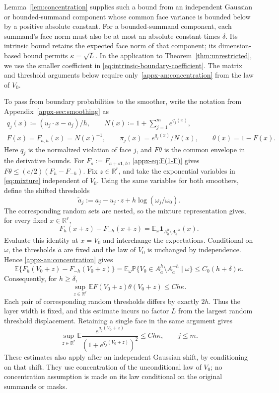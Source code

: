 \documentclass[11pt,letterpaper,twoside,leqno]{article}
\theoremstyle{bookplain}
\theoremstyle{bookremark}
\newcommand{\E}{\mathbb E}
\newcommand{\Pp}{\mathbb P}
\newcommand{\R}{\mathbb R}
\newcommand{\ind}{\mathbf 1}
\begin{document}
Lemma~\ref{lem:concentration} supplies such a bound from an independent
Gaussian or bounded-summand component whose common face variance is
bounded below by a positive absolute constant. For a bounded-summand
component, each summand's face norm must also be at most an absolute
constant times \(\delta\). Its intrinsic bound retains the expected
face norm of that component; its dimension-based bound permits
\(\kappa=\sqrt L\). In the application to
Theorem~\ref{thm:unrestricted}, we use the smaller coefficient in
\eqref{eq:intrinsic-boundary-coefficient}. The matrix and threshold
arguments below require only~\eqref{appx-an:concentration} from the
law of \(V_0\).

To pass from boundary probabilities to the smoother, write the
notation from Appendix~\ref{appx-sec:smoothing} as
\begin{equation}
 \label{appx-an:basic-notation}
 \begin{gathered}
 q_j(x)\coloneqq(u_j\cdot x-a_j)/h,\qquad
 N(x)\coloneqq1+\sum_{j=1}^m e^{q_j(x)},\\
 F(x)=F_{a,h}(x)=N(x)^{-1},\qquad
 \pi_j(x)=e^{q_j(x)}/N(x),\qquad \theta(x)=1-F(x).
 \end{gathered}
\end{equation}
Here \(q_j\) is the normalized violation of face \(j\), and
\(F\theta\) is the common envelope in the derivative bounds.
For \(F_s:=F_{a+s\mathbf1,h}\),
\eqref{appx-eq:F(1-F)} gives
\(F\theta\le(e/2)(F_h-F_{-h})\).
Fix $z\in\R^r$, and take the exponential variables in
\eqref{eq:mixture} independent of $V_0$. Using the same variables
for both smoothers, define the shifted thresholds
\[
 \widetilde a_j
 :=a_j-u_j\cdot z+h\log(\omega_j/\omega_0).
\]
The corresponding random sets are nested, so the mixture
representation gives, for every fixed $x\in\R^r$,
\[
 F_h(x+z)-F_{-h}(x+z)
 =\E_\omega\ind_{A_{\widetilde a}^{h}
                    \setminus A_{\widetilde a}^{-h}}(x).
\]
Evaluate this identity at $x=V_0$ and interchange the expectations.
Conditional on $\omega$, the thresholds $\widetilde a$ are fixed
and the law of $V_0$ is unchanged by independence. Hence
\eqref{appx-an:concentration} gives
\[
 \E\{F_h(V_0+z)-F_{-h}(V_0+z)\}
 =\E_\omega\Pp\{V_0\in
       A_{\widetilde a}^{h}\setminus A_{\widetilde a}^{-h}
       \mid\omega\}
 \le C_0(h+\delta)\kappa.
\]
Consequently, for \(h\ge\delta\),
\begin{equation}
 \sup_{z\in\R^r}\E F(V_0+z)\theta(V_0+z)\le Ch\kappa.
 \label{appx-an:weight-concentration}
\end{equation}
Each pair of corresponding random thresholds differs by exactly
$2h$. Thus the layer width is fixed, and this estimate incurs no
factor $L$ from the largest random threshold displacement.
Retaining a single face in the same argument gives
\[
 \sup_{z\in\R^r}\E
 \frac{e^{q_j(V_0+z)}}{(1+e^{q_j(V_0+z)})^2}
 \le Ch\kappa,\qquad j\le m.
\]
These estimates also apply after an independent Gaussian shift,
by conditioning on that shift. They use concentration of the
unconditional law of \(V_0\); no concentration assumption is made
on its law conditional on the original summands or masks.
\end{document}
